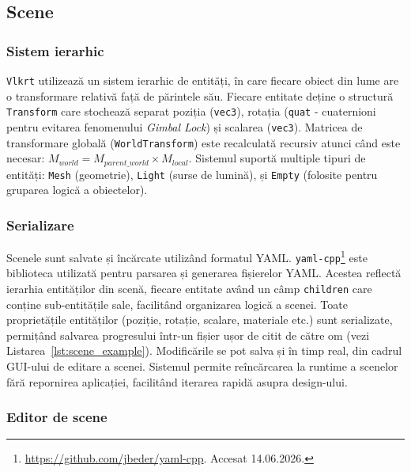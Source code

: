 \documentclass[12pt,a4paper]{report}
\numberwithin{equation}{section} %
\begin{document}
\subsection{Scene}

\subsubsection{Sistem ierarhic}

\texttt{Vlkrt} utilizează un sistem ierarhic de entități, în care fiecare obiect din lume are o transformare relativă față de părintele său.
Fiecare entitate deține o structură \texttt{Transform} care stochează separat poziția (\texttt{vec3}), rotația (\texttt{quat} - cuaternioni pentru evitarea fenomenului \textit{Gimbal Lock}) și scalarea (\texttt{vec3}).
Matricea de transformare globală (\texttt{WorldTransform}) este recalculată recursiv atunci când este necesar: $M_{world} = M_{parent\_world} \times M_{local}$.
Sistemul suportă multiple tipuri de entități: \texttt{Mesh} (geometrie), \texttt{Light} (surse de lumină), și \texttt{Empty} (folosite pentru gruparea logică a obiectelor).

\subsubsection{Serializare}

Scenele sunt salvate și încărcate utilizând formatul YAML.
\texttt{yaml-cpp}\footnote{\url{https://github.com/jbeder/yaml-cpp}. Accesat 14.06.2026.} este biblioteca utilizată pentru parsarea și generarea fișierelor YAML.
Acestea reflectă ierarhia entităților din scenă, fiecare entitate având un câmp \texttt{children} care conține sub-entitățile sale, facilitând organizarea logică a scenei.
Toate proprietățile entităților (poziție, rotație, scalare, materiale etc.) sunt serializate, permițând salvarea progresului într-un fișier ușor de citit de către om (vezi Listarea~\ref{lst:scene_example}).
Modificările se pot salva și în timp real, din cadrul GUI-ului de editare a scenei.
Sistemul permite reîncărcarea la runtime a scenelor fără repornirea aplicației, facilitând iterarea rapidă asupra design-ului.

\subsubsection{Editor de scene}
\end{document}
